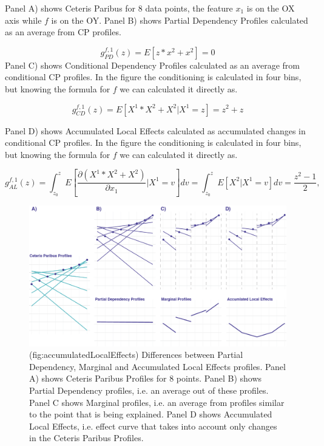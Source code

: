 \documentclass[12pt,]{krantz}
\theoremstyle{definition}
\theoremstyle{definition}
\theoremstyle{definition}
\theoremstyle{remark}
\begin{document}
Panel A) shows Ceteris Paribus for 8 data points, the feature \(x_1\) is
on the OX axis while \(f\) is on the OY. Panel B) shows Partial
Dependency Profiles calculated as an average from CP profiles.

\[
g_{PD}^{f,1}(z) = E[z*x^2 + x^2] = 0
\] Panel C) shows Conditional Dependency Profiles calculated as an
average from conditional CP profiles. In the figure the conditioning is
calculated in four bins, but knowing the formula for \(f\) we can
calculated it directly as.

\[
g_{CD}^{f,1}(z) = E[X^1*X^2 + X^2 | X^1 = z] = z^2+z
\]

Panel D) shows Accumulated Local Effects calculated as accumulated
changes in conditional CP profiles. In the figure the conditioning is
calculated in four bins, but knowing the formula for \(f\) we can
calculated it directly as.

\[
g_{AL}^{f,1}(z) = \int_{z_0}^z E\left[\frac{\partial (X^1*X^2 + X^2)}{\partial x_1}|X^1 = v\right] dv  = \int_{z_0}^z E\left[X^2|X^1 = v\right] dv  = \frac{z^2 -1 }{2},
\]

\begin{figure}

{\centering \includegraphics[width=0.9\linewidth]{figure/CP_ALL} 

}

\caption{(fig:accumulatedLocalEffects) Differences between Partial Dependency, Marginal and Accumulated Local Effects profiles. Panel A) shows Ceteris Paribus Profiles for 8 points. Panel B) shows Partial Dependency profiles, i.e. an average out of these profiles. Panel C shows Marginal profiles, i.e. an average from profiles similar to the point that is being explained. Panel D shows Accumulated Local Effects, i.e. effect curve that takes into account only changes in the Ceteris Paribus Profiles.}\label{fig:accumulatedLocalEffects}
\end{figure}
\end{document}
